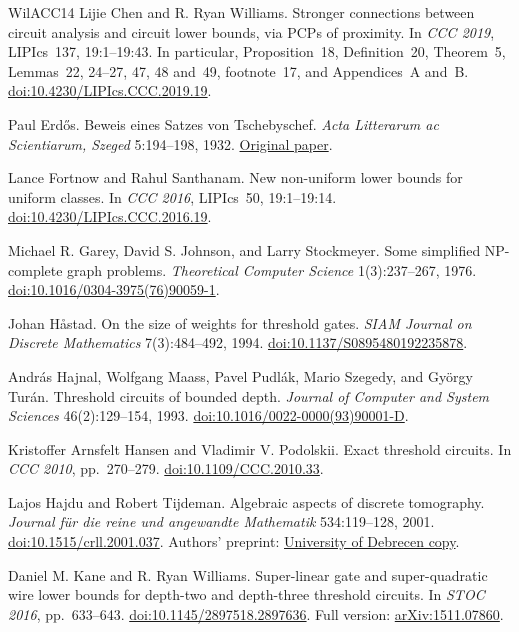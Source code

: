 \documentclass[11pt,letterpaper]{article}
\theoremstyle{definition}
\theoremstyle{remark}
\begin{document}
\begin{thebibliography}{WilACC14}
Lijie Chen and R. Ryan Williams.
Stronger connections between circuit analysis and circuit lower
bounds, via PCPs of proximity.
In \emph{CCC 2019}, LIPIcs~137, 19:1--19:43.
In particular, Proposition~18, Definition~20, Theorem~5, Lemmas~22,
24--27, 47, 48 and~49, footnote~17, and Appendices~A and~B.
\href{https://doi.org/10.4230/LIPIcs.CCC.2019.19}{doi:10.4230/LIPIcs.CCC.2019.19}.

Paul Erd\H{o}s. Beweis eines Satzes von Tschebyschef.
\emph{Acta Litterarum ac Scientiarum, Szeged} 5:194--198, 1932.
\href{https://users.renyi.hu/~p_erdos/1932-01.pdf}{Original paper}.

Lance Fortnow and Rahul Santhanam. New non-uniform lower bounds for
uniform classes. In \emph{CCC 2016}, LIPIcs~50, 19:1--19:14.
\href{https://doi.org/10.4230/LIPIcs.CCC.2016.19}{doi:10.4230/LIPIcs.CCC.2016.19}.

Michael R. Garey, David S. Johnson, and Larry Stockmeyer.
Some simplified NP-complete graph problems.
\emph{Theoretical Computer Science} 1(3):237--267, 1976.
\href{https://doi.org/10.1016/0304-3975(76)90059-1}{doi:10.1016/0304-3975(76)90059-1}.

Johan H\aa{}stad. On the size of weights for threshold gates.
\emph{SIAM Journal on Discrete Mathematics} 7(3):484--492, 1994.
\href{https://doi.org/10.1137/S0895480192235878}{doi:10.1137/S0895480192235878}.

Andr\'as Hajnal, Wolfgang Maass, Pavel Pudl\'ak, Mario Szegedy,
and Gy\"orgy Tur\'an. Threshold circuits of bounded depth.
\emph{Journal of Computer and System Sciences} 46(2):129--154, 1993.
\href{https://doi.org/10.1016/0022-0000(93)90001-D}{doi:10.1016/0022-0000(93)90001-D}.

Kristoffer Arnsfelt Hansen and Vladimir V. Podolskii.
Exact threshold circuits. In \emph{CCC 2010}, pp.~270--279.
\href{https://doi.org/10.1109/CCC.2010.33}{doi:10.1109/CCC.2010.33}.

Lajos Hajdu and Robert Tijdeman. Algebraic aspects of discrete tomography.
\emph{Journal f\"ur die reine und angewandte Mathematik} 534:119--128, 2001.
\href{https://doi.org/10.1515/crll.2001.037}{doi:10.1515/crll.2001.037}.
Authors' preprint:
\href{https://math.unideb.hu/sites/default/files/inline-files/disctom8.pdf}{University of Debrecen copy}.

Daniel M. Kane and R. Ryan Williams.
Super-linear gate and super-quadratic wire lower bounds for depth-two
and depth-three threshold circuits.
In \emph{STOC 2016}, pp.~633--643.
\href{https://doi.org/10.1145/2897518.2897636}{doi:10.1145/2897518.2897636}.
Full version: \href{https://arxiv.org/abs/1511.07860}{arXiv:1511.07860}.


\end{thebibliography}
\end{document}
